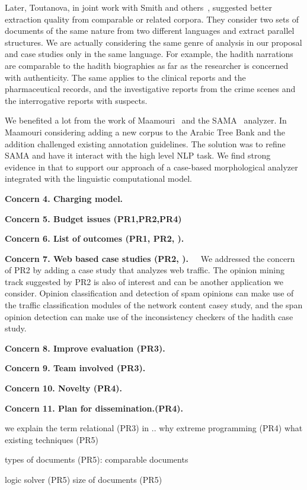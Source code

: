 \documentclass[12pt]{article}
\begin{document}
Later, Toutanova, in joint work with Smith and others~\cite{Smi10},
suggested better extraction quality from comparable or related
corpora. 
They consider two sets of documents of the same nature from
two different languages and extract parallel structures. 
We are actually considering the same genre of analysis in 
our proposal and case studies only in the same language. 
For example, the hadith narrations are comparable to the hadith 
biographies as far as the researcher is concerned with authenticity.
The same applies to the clinical reports and the pharmaceutical 
records, and the investigative reports from the crime scenes
and the interrogative reports with suspects.

We benefited a lot from the work of Maamouri~\cite{Maamouri:10}
and the SAMA~\cite{Kulick:10} analyzer. 
In~\cite{Maamouri:10} Maamouri considering adding a new corpus
to the Arabic Tree Bank and the addition challenged existing
annotation guidelines. 
The solution was to refine SAMA and have it interact with the
high level NLP task.
We find strong evidence in that to support our approach of
a case-based morphological analyzer integrated
with the linguistic computational model.


{\bf Concern 4. Charging model.~~}

{\bf Concern 5. Budget issues (PR1,PR2,PR4)~~}

{\bf Concern 6. List of outcomes (PR1, PR2, ).~~}

{\bf Concern 7. Web based case studies (PR2, ).~~}
We addressed the concern of PR2 by adding a case study that 
analyzes web traffic. 
The opinion mining track suggested by PR2 is also of interest and 
can be another application we consider.
Opinion classification and detection of spam opinions
can make use of the traffic classification modules of the network
content casey study, and the span opinion detection can 
make use of the inconsistency checkers of the hadith case study.


{\bf Concern 8. Improve evaluation (PR3).~~}

{\bf Concern 9. Team involved (PR3).~~}

{\bf Concern 10. Novelty (PR4).~~}

{\bf Concern 11. Plan for dissemination.(PR4).~~}



we explain the term relational (PR3) in .. 
why extreme programming (PR4)
what existing techniques (PR5)

types of documents (PR5): comparable documents

logic solver (PR5)
size of documents (PR5)











\pagebreak
%
%

%
{\small
  
}
\end{document}

